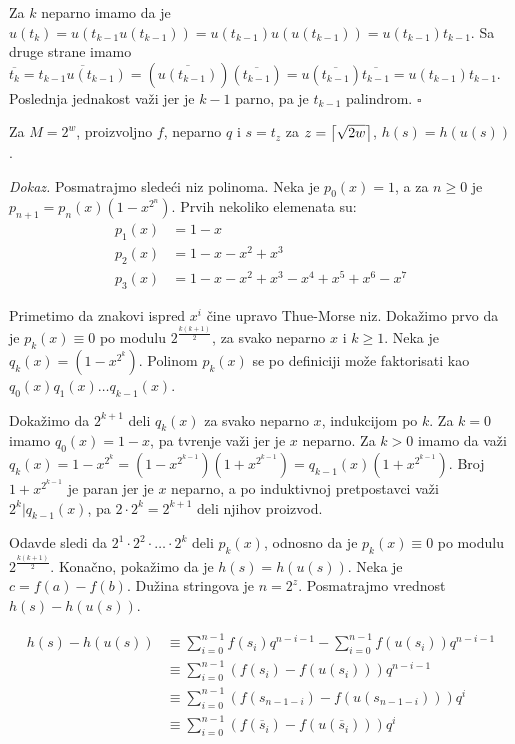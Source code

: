 Za $k$ neparno imamo da je $u(t_{k}) = u(t_{k-1}u(t_{k-1})) = u(t_{k-1})u(u(t_{k-1})) = u(t_{k-1})t_{k-1}$. Sa druge strane imamo $\overline{t_k} = \overline{t_{k-1}u(t_{k-1})} = (\overline{u(t_{k-1})})(\overline{t_{k-1}}) = u(\overline{t_{k-1}})\overline{t_{k-1}} = u(t_{k-1})t_{k-1}$. Poslednja jednakost va\v zi jer je $k-1$ parno, pa je $t_{k-1}$ palindrom. \hfill $\square$

\begin{thm}
Za $M = 2^{w}$, proizvoljno $f$, neparno $q$ i $s = t_z$ za $z = \left \lceil \sqrt{2w} \right \rceil$, $h(s) = h(u(s))$.
\end{thm}

\textit{Dokaz.} Posmatrajmo slede\' ci niz polinoma. Neka je $p_0(x) = 1$, a za $n \geq 0$ je $p_{n+1} = p_n(x)(1-x^{2^n})$. Prvih nekoliko elemenata su:
\begin{align*}
    p_1(x) & = 1-x \\
    p_2(x) & = 1-x-x^2+x^3 \\
    p_3(x) & = 1 - x - x^2 + x^3 - x^4 + x^5 + x^6 - x^7
\end{align*}

Primetimo da znakovi ispred $x^i$ \v cine upravo Thue-Morse niz. Doka\v zimo prvo da je $p_k(x) \equiv 0$ po modulu $2^\frac{k(k+1)}{2}$, za svako neparno $x$ i $k \geq 1$. Neka je $q_k(x) = (1-x^{2^k})$. Polinom $p_k(x)$ se po definiciji mo\v ze faktorisati kao $q_0(x)q_1(x)\ldots q_{k-1}(x)$.

Doka\v zimo da $2^{k+1}$ deli $q_k(x)$ za svako neparno $x$, indukcijom po $k$. Za $k=0$ imamo $q_0(x) = 1-x$, pa tvr\dj enje va\v zi jer je $x$ neparno. Za $k > 0$ imamo da va\v zi $q_k(x) = 1-x^{2^k} = (1-x^{2^{k-1}})(1+x^{2^{k-1}}) = q_{k-1}(x)(1+x^{2^{k-1}})$. Broj $1+x^{2^{k-1}}$ je paran jer je $x$ neparno, a po induktivnoj pretpostavci va\v zi $2^k | q_{k-1}(x)$, pa $2\cdot 2^k = 2^{k+1}$ deli njihov proizvod.

Odavde sledi da $2^1\cdot2^2\cdot \ldots \cdot 2^k$ deli $p_k(x)$, odnosno da je $p_k(x) \equiv 0$ po modulu $2^\frac{k(k+1)}{2}$. Kona\v cno, poka\v zimo da je $h(s) = h(u(s))$. Neka je $c = f(a) - f(b)$. Du\v zina stringova je $n = 2^z$. Posmatrajmo vrednost $h(s) - h(u(s))$.

\begin{align*}
h(s) - h(u(s)) & \equiv \sum_{i=0}^{n-1}f(s_i) q^{n-i-1} - \sum_{i=0}^{n-1}f(u(s_i)) q^{n-i-1} \\
               & \equiv \sum_{i=0}^{n-1}(f(s_i) - f(u(s_i))) q^{n-i-1} \\
               & \equiv \sum_{i=0}^{n-1}(f(s_{n-1-i}) - f(u(s_{n-1-i}))) q^i \\
               & \equiv \sum_{i=0}^{n-1}(f(\overline{s}_i) - f(u(\overline{s}_i))) q^i \\
\end{align*}

